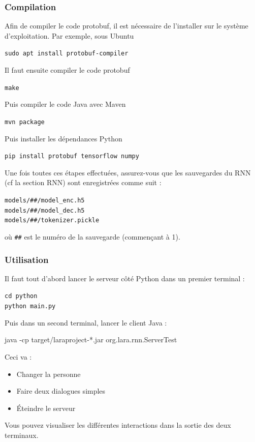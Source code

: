 \documentclass[10pt,a4paper]{article}
\begin{document}
\subsubsection{Compilation}
Afin de compiler le code protobuf, il est nécessaire de l'installer sur le système d'exploitation. Par exemple, sous Ubuntu
\begin{center}
\texttt{sudo apt install protobuf-compiler}
\end{center}
Il faut ensuite compiler le code protobuf
\begin{center}
\texttt{make}
\end{center}
Puis compiler le code Java avec Maven
\begin{center}
\texttt{mvn package}
\end{center}
Puis installer les dépendances Python
\begin{center}
\texttt{pip install protobuf tensorflow numpy}
\end{center}
Une fois toutes ces étapes effectuées, assurez-vous que les sauvegardes du RNN (cf la section RNN) sont enregistrées comme suit :
\begin{center}
\texttt{models/\#\#/model\_enc.h5} \\
\texttt{models/\#\#/model\_dec.h5} \\
\texttt{models/\#\#/tokenizer.pickle}
\end{center}
où \texttt{\#\#} est le numéro de la sauvegarde (commençant à 1).
\subsubsection{Utilisation}
Il faut tout d'abord lancer le serveur côté Python dans un premier terminal :
\begin{center}
\texttt{cd python} \\
\texttt{python main.py}
\end{center}
Puis dans un second terminal, lancer le client Java :
\begin{center}
java -cp target/laraproject-*.jar org.lara.rnn.ServerTest
\end{center}
Ceci va :
\begin{itemize}
\item Changer la personne
\item Faire deux dialogues simples
\item Éteindre le serveur
\end{itemize}
Vous pouvez visualiser les différentes interactions dans la sortie des deux terminaux.
 
\end{document}
